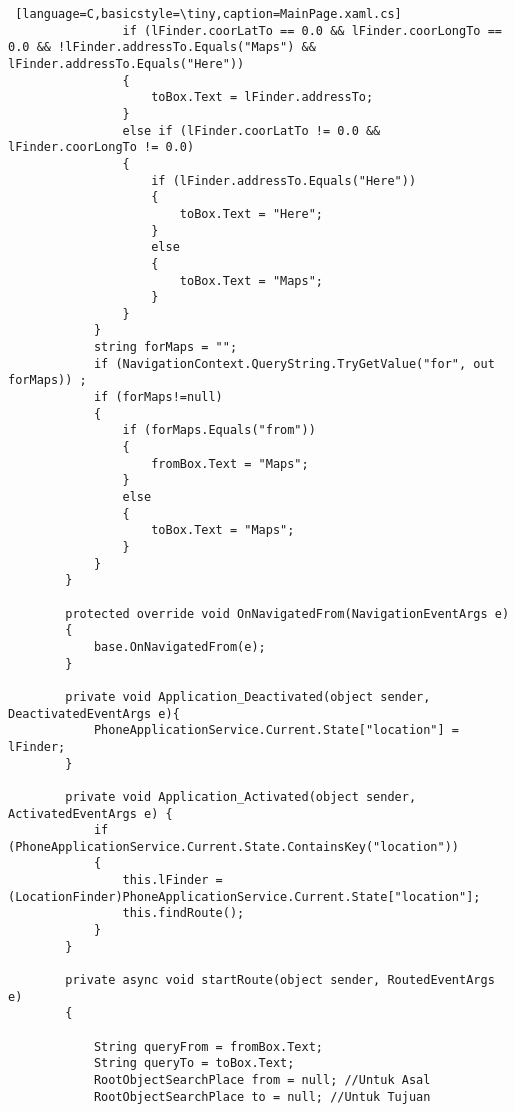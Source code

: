 \begin{lstlisting} [language=C,basicstyle=\tiny,caption=MainPage.xaml.cs]
                if (lFinder.coorLatTo == 0.0 && lFinder.coorLongTo == 0.0 && !lFinder.addressTo.Equals("Maps") && lFinder.addressTo.Equals("Here"))
                {
                    toBox.Text = lFinder.addressTo;
                }
                else if (lFinder.coorLatTo != 0.0 && lFinder.coorLongTo != 0.0)
                {
                    if (lFinder.addressTo.Equals("Here"))
                    {
                        toBox.Text = "Here";
                    }
                    else
                    {
                        toBox.Text = "Maps";
                    }
                }
            }
            string forMaps = "";
            if (NavigationContext.QueryString.TryGetValue("for", out forMaps)) ;
            if (forMaps!=null)
            {
                if (forMaps.Equals("from"))
                {
                    fromBox.Text = "Maps";
                }
                else
                {
                    toBox.Text = "Maps";
                }
            }
        }

        protected override void OnNavigatedFrom(NavigationEventArgs e)
        {
            base.OnNavigatedFrom(e);
        }

        private void Application_Deactivated(object sender, DeactivatedEventArgs e){
            PhoneApplicationService.Current.State["location"] = lFinder;
        }

        private void Application_Activated(object sender, ActivatedEventArgs e) {
            if (PhoneApplicationService.Current.State.ContainsKey("location"))
            {
                this.lFinder = (LocationFinder)PhoneApplicationService.Current.State["location"];
                this.findRoute();
            }
        }

        private async void startRoute(object sender, RoutedEventArgs e)
        {
            
            String queryFrom = fromBox.Text;
            String queryTo = toBox.Text;
            RootObjectSearchPlace from = null; //Untuk Asal
            RootObjectSearchPlace to = null; //Untuk Tujuan


\end{lstlisting}
